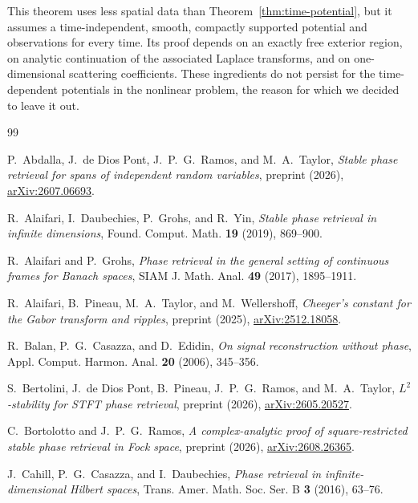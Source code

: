 \documentclass[11pt]{amsart}
\theoremstyle{remark}
\newcommand{\1}{\mathbf 1}
\begin{document}
This theorem uses less spatial data than Theorem~\ref{thm:time-potential},
but it assumes a time-independent, smooth, compactly supported potential and
observations for every time.  Its proof depends on an exactly free exterior
region, on analytic continuation of the associated Laplace transforms, and
on one-dimensional scattering coefficients.  These ingredients do not
persist for the time-dependent potentials in the nonlinear problem, the reason for which we decided to leave it out. 

\begin{thebibliography}{99}

P.~Abdalla, J.~de Dios Pont, J.~P.~G.~Ramos, and M.~A.~Taylor,
\emph{Stable phase retrieval for spans of independent random variables},
preprint (2026), \href{https://arxiv.org/abs/2607.06693}{arXiv:2607.06693}.

R.~Alaifari, I.~Daubechies, P.~Grohs, and R.~Yin,
\emph{Stable phase retrieval in infinite dimensions},
Found. Comput. Math. \textbf{19} (2019), 869--900.

R.~Alaifari and P.~Grohs,
\emph{Phase retrieval in the general setting of continuous frames for Banach spaces},
SIAM J. Math. Anal. \textbf{49} (2017), 1895--1911.

R.~Alaifari, B.~Pineau, M.~A.~Taylor, and M.~Wellershoff,
\emph{Cheeger's constant for the Gabor transform and ripples},
preprint (2025), \href{https://arxiv.org/abs/2512.18058}{arXiv:2512.18058}.

R.~Balan, P.~G.~Casazza, and D.~Edidin,
\emph{On signal reconstruction without phase},
Appl. Comput. Harmon. Anal. \textbf{20} (2006), 345--356.

S.~Bertolini, J.~de Dios Pont, B.~Pineau, J.~P.~G.~Ramos, and M.~A.~Taylor,
\emph{$L^2$-stability for STFT phase retrieval},
preprint (2026), \href{https://arxiv.org/abs/2605.20527}{arXiv:2605.20527}.

C.~Bortolotto and J.~P.~G.~Ramos,
\emph{A complex-analytic proof of square-restricted stable phase retrieval in Fock space},
preprint (2026), \href{https://arxiv.org/abs/2608.26365}{arXiv:2608.26365}.

J.~Cahill, P.~G.~Casazza, and I.~Daubechies,
\emph{Phase retrieval in infinite-dimensional Hilbert spaces},
Trans. Amer. Math. Soc. Ser. B \textbf{3} (2016), 63--76.


\end{thebibliography}
\end{document}

